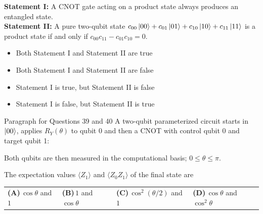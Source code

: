 \documentclass[11pt,a4paper]{article}
\newcommand{\optlabel}[1]{\textbf{(#1)}}
\newenvironment{qitem}[1]{\begin{list}{}{\setlength{\leftmargin}{3.3em}\setlength{\labelwidth}{3.1em}%
  \setlength{\labelsep}{0.2em}\setlength{\topsep}{3pt}\setlength{\parsep}{3pt}}\item[\textbf{Q.#1}\hfill]}{\end{list}}
\newcommand{\qsep}{\par\vspace{2pt}{\color{black!15}\hrule}\vspace{4pt}}
\begin{document}
\begin{qitem}{38}
\textbf{Statement I:} A CNOT gate acting on a product state always produces an entangled state.\\[1mm]
\textbf{Statement II:} A pure two-qubit state $c_{00}\ket{00} + c_{01}\ket{01} + c_{10}\ket{10} + c_{11}\ket{11}$ is a product state if and
only if $c_{00}c_{11} - c_{01}c_{10} = 0$.
\begin{itemize}[leftmargin=2.6em, labelsep=0.4em, itemsep=2pt, topsep=3pt]
\item[\optlabel{A}] Both Statement I and Statement II are true
\item[\optlabel{B}] Both Statement I and Statement II are false
\item[\optlabel{C}] Statement I is true, but Statement II is false
\item[\optlabel{D}] Statement I is false, but Statement II is true
\end{itemize}
\end{qitem}
\qsep

\begin{passagebox}{Paragraph for Questions 39 and 40}
A two-qubit parameterized circuit starts in $\ket{00}$, applies $R_Y(\theta)$ to qubit 0 and then a CNOT with
control qubit 0 and target qubit 1:
\begin{center}
\end{center}
Both qubits are then measured in the computational basis; $0 \le \theta \le \pi$.
\end{passagebox}
\begin{qitem}{39}
The expectation values $\langle Z_1\rangle$ and $\langle Z_0Z_1\rangle$ of the final state are
\par\smallskip\noindent\begin{tabularx}{\linewidth}{@{}*{4}{L}@{}}
\optlabel{A}\,$\cos\theta$ and $1$ & \optlabel{B}\,$1$ and $\cos\theta$ & \optlabel{C}\,$\cos^2(\theta/2)$ and $1$ & \optlabel{D}\,$\cos\theta$ and $\cos^2\theta$
\end{tabularx}
\end{qitem}
\qsep
\end{document}
